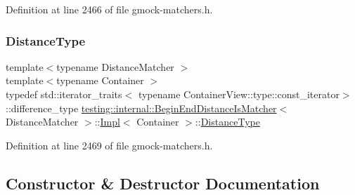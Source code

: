 Definition at line 2466 of file gmock-\/matchers.\+h.

\mbox{\label{classtesting_1_1internal_1_1BeginEndDistanceIsMatcher_1_1Impl_a10d901c49e2793dae6bcce6fa1a4e9fe}} 
\subsubsection{\texorpdfstring{Distance\+Type}{DistanceType}}
{\footnotesize\ttfamily template$<$typename Distance\+Matcher $>$ \\
template$<$typename Container $>$ \\
typedef std\+::iterator\+\_\+traits$<$ typename Container\+View\+::type\+::const\+\_\+iterator$>$\+::difference\+\_\+type \hyperlink{classtesting_1_1internal_1_1BeginEndDistanceIsMatcher}{testing\+::internal\+::\+Begin\+End\+Distance\+Is\+Matcher}$<$ Distance\+Matcher $>$\+::\hyperlink{classtesting_1_1internal_1_1BeginEndDistanceIsMatcher_1_1Impl}{Impl}$<$ Container $>$\+::\hyperlink{classtesting_1_1internal_1_1BeginEndDistanceIsMatcher_1_1Impl_a10d901c49e2793dae6bcce6fa1a4e9fe}{Distance\+Type}}



Definition at line 2469 of file gmock-\/matchers.\+h.



\subsection{Constructor \& Destructor Documentation}
\mbox{\label{classtesting_1_1internal_1_1BeginEndDistanceIsMatcher_1_1Impl_a92f5afc23d317260d4a5bd091d2904a4}} 
